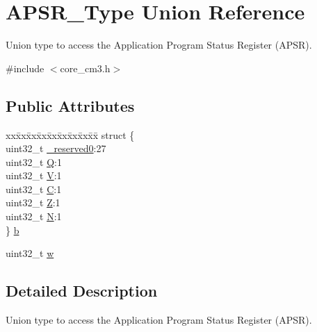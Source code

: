 \hypertarget{union_a_p_s_r___type}{\section{\-A\-P\-S\-R\-\_\-\-Type \-Union \-Reference}
\label{union_a_p_s_r___type}
}


\-Union type to access the \-Application \-Program \-Status \-Register (\-A\-P\-S\-R).  




{\ttfamily \#include $<$core\-\_\-cm3.\-h$>$}

\subsection*{\-Public \-Attributes}
\begin{DoxyCompactItemize}
\item 
\begin{tabbing}
xx\=xx\=xx\=xx\=xx\=xx\=xx\=xx\=xx\=\kill
struct \{\\
\>uint32\_t \hyperlink{union_a_p_s_r___type_afbce95646fd514c10aa85ec0a33db728}{\_reserved0}:27\\
\>uint32\_t \hyperlink{union_a_p_s_r___type_a22d10913489d24ab08bd83457daa88de}{Q}:1\\
\>uint32\_t \hyperlink{union_a_p_s_r___type_a8004d224aacb78ca37774c35f9156e7e}{V}:1\\
\>uint32\_t \hyperlink{union_a_p_s_r___type_a86e2c5b891ecef1ab55b1edac0da79a6}{C}:1\\
\>uint32\_t \hyperlink{union_a_p_s_r___type_a3b04d58738b66a28ff13f23d8b0ba7e5}{Z}:1\\
\>uint32\_t \hyperlink{union_a_p_s_r___type_a7e7bbba9b00b0bb3283dc07f1abe37e0}{N}:1\\
\} \hyperlink{union_a_p_s_r___type_a7dbc79a057ded4b11ca5323fc2d5ab14}{b}\\

\end{tabbing}\item 
uint32\-\_\-t \hyperlink{union_a_p_s_r___type_ae4c2ef8c9430d7b7bef5cbfbbaed3a94}{w}
\end{DoxyCompactItemize}


\subsection{\-Detailed \-Description}
\-Union type to access the \-Application \-Program \-Status \-Register (\-A\-P\-S\-R). 

